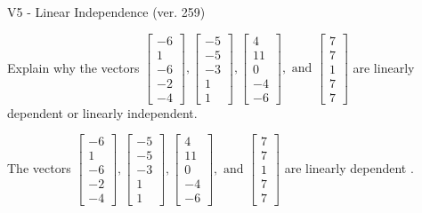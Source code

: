 \begin{exercise}
  \begin{exerciseTitle}V5 - Linear Independence (ver. 259)\end{exerciseTitle}
  \begin{exerciseStatement}
    Explain why the vectors \(\left[\begin{array}{r}
-6 \\
1 \\
-6 \\
-2 \\
-4
\end{array}\right] , \left[\begin{array}{r}
-5 \\
-5 \\
-3 \\
1 \\
1
\end{array}\right] , \left[\begin{array}{r}
4 \\
11 \\
0 \\
-4 \\
-6
\end{array}\right] , \text{ and } \left[\begin{array}{r}
7 \\
7 \\
1 \\
7 \\
7
\end{array}\right]\) are linearly dependent or linearly independent.	


  \end{exerciseStatement}
  \begin{exerciseAnswer}
   The vectors \(\left[\begin{array}{r}
-6 \\
1 \\
-6 \\
-2 \\
-4
\end{array}\right] , \left[\begin{array}{r}
-5 \\
-5 \\
-3 \\
1 \\
1
\end{array}\right] , \left[\begin{array}{r}
4 \\
11 \\
0 \\
-4 \\
-6
\end{array}\right] , \text{ and } \left[\begin{array}{r}
7 \\
7 \\
1 \\
7 \\
7
\end{array}\right]\) are 
  	 linearly dependent  .
  


  \end{exerciseAnswer}
\end{exercise}